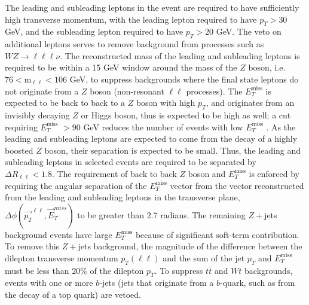\documentclass[11pt,a4paper,openright,twoside]{report}
\newcommand{\met}{$E_T^{\mathrm{miss}}$ }
\begin{document}
The leading and subleading leptons in the event are required to have sufficiently high transverse momentum, with the leading lepton required to have $p_T>30$ GeV, and the subleading lepton required to have $p_T>20$ GeV. The veto on additional leptons serves to remove background from processes such as $WZ\to \ell\ell\ell\nu$. The reconstructed mass of the leading and subleading leptons is required to be within a 15 GeV window around the mass of the $Z$ boson, i.e. $76<\mathrm{m_{\ell\ell}<106}$ GeV, to suppress backgrounds where the final state leptons do not originate from a $Z$ boson (non-resonant $\ell\ell$ processes). The \met is expected to be back to back to a $Z$ boson with high $p_T$, and originates from an invisibly decaying $Z$ or Higgs boson, thus is expected to be high as well; a cut requiring \met$>90$ GeV reduces the number of events with low \met. As the leading and subleading leptons are expected to come from the decay of a highly boosted $Z$ boson, their separation is expected to be small. Thus, the leading and subleading leptons in selected events are required to be separated by $\Delta R_{\ell\ell}<1.8$. The requirement of back to back $Z$ boson and \met is enforced by requiring the angular separation of the \met vector from the vector reconstructed from the leading and subleading leptons in the transverse plane, $\Delta\phi(\vec{p_T}^{\ell\ell},\vec{E}_T^{miss})$ to be greater than 2.7 radians. The remaining $Z+$jets background events have large \met because of significant soft-term contribution. To remove this $Z+$jets background, the magnitude of the difference between the dilepton transverse momentum $p_T(\ell\ell)$ and the sum of the jet $p_T$ and \met must be less than 20\% of the dilepton $p_T$. To suppress $t\bar{t}$ and $Wt$ backgrounds, events with one or more $b$-jets (jets that originate from a $b$-quark, such as from the decay of a top quark) are vetoed.
\end{document}
